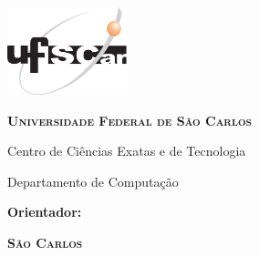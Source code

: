 \includegraphics[width=.94in, height=1in, keepaspectratio=true]{images/LogoUFSCar}
\vspace*{1cm}
\begin{center}
    
	    {\large \scshape \bfseries Universidade Federal de São Carlos \\

    \vspace{.5cm}

    Centro de Ciências Exatas e de Tecnologia \\

     \vspace{.5cm}

   Departamento de Computação}
\end{center}
\vspace{2cm}
\begin{center}
    {\Large \scshape \autor}
\end{center}
\vspace{2cm}
\begin{center}
    {\Large \scshape \bfseries \titulo}
\end{center}
\vspace{2cm}
{\begin{center}\bfseries
Orientador:  \orientador
\end{center}}
\vspace{.25cm}
\vfill
\begin{center}
    {\scshape \bfseries São Carlos \\ \ano}
\end{center}
